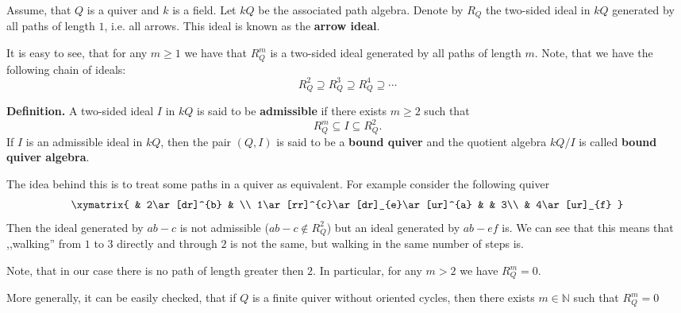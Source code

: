 \documentclass[12pt]{article}
\begin{document}
Assume, that $Q$ is a quiver and $k$ is a field. Let $kQ$ be the associated path algebra. Denote by $R_Q$ the two-sided ideal in $kQ$ generated by all paths of length $1$, i.e. all arrows. This ideal is known as the \textbf{arrow ideal}.

It is easy to see, that for any $m\geqslant 1$ we have that $R_Q^m$ is a two-sided ideal generated by all paths of length $m$. Note, that we have the following chain of ideals:
$$R_Q^2\supseteq R_Q^3\supseteq R_Q^4\supseteq\cdots$$

\textbf{Definition.} A two-sided ideal $I$ in $kQ$ is said to be \textbf{admissible} if there exists $m\geqslant 2$ such that 
$$R_Q^m\subseteq I\subseteq R_Q^2.$$
If $I$ is an admissible ideal in $kQ$, then the pair $(Q,I)$ is said to be a \textbf{bound quiver} and the quotient algebra $kQ/I$ is called \textbf{bound quiver algebra}.

The idea behind this is to treat some paths in a quiver as equivalent. For example consider the following quiver
$$\xymatrix{
& 2\ar[dr]^{b} & \\
1\ar[rr]^{c}\ar[dr]_{e}\ar[ur]^{a} & & 3\\
& 4\ar[ur]_{f}
}$$
Then the ideal generated by $ab-c$ is not admissible ($ab-c\not\in R^2_Q$) but an ideal generated by $ab-ef$ is. We can see that this means that ,,walking'' from $1$ to $3$ directly and through $2$ is not the same, but walking in the same number of steps is.

Note, that in our case there is no path of length greater then $2$. In particular, for any $m> 2$ we have $R_Q^m=0$.

More generally, it can be easily checked, that if $Q$ is a finite quiver without oriented cycles, then there exists $m\in\mathbb{N}$ such that $R_Q^m=0$
\end{document}
